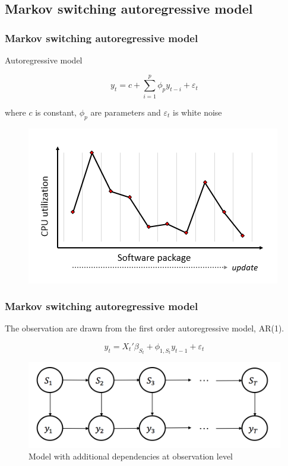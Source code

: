 \documentclass{beamer}
\begin{document}
\subsection{Markov switching autoregressive model} %

\begin{frame}
\frametitle{Markov switching autoregressive model}

Autoregressive model

$$y_{t} = c + \sum_{i=1}^{p}\phi_{p}y_{t-i} + \varepsilon_{t}$$

where $c$ is constant, $\phi_{p}$ are parameters and $\varepsilon_{t}$ is white noise

\begin{figure}
	\includegraphics[width=0.6\linewidth]{inde}
\end{figure}
\end{frame}

\begin{frame}
\frametitle{Markov switching autoregressive model}
The observation are drawn from the first order autoregressive model, AR(1).

$$y_{t} = {X_{t}}' \beta_{S_{t}} + \phi_{1,S_{t}} y_{t-1} + \varepsilon_{t}$$

\begin{figure}
	\includegraphics[width=0.5\linewidth]{msm-ar}
	\caption{Model with additional dependencies at observation level}
\end{figure}
\end{frame}
\end{document}

